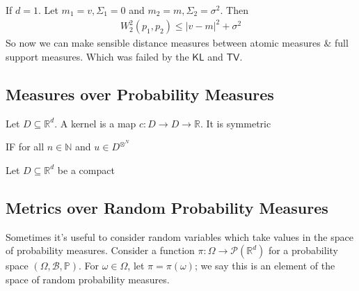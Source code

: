 \documentclass[11pt,fleqn]{article}
\numberwithin{equation}{section}
\theoremstyle{definition}
\theoremstyle{definition}
\begin{document}
\begin{remark}
	If $d=1$. Let $m_1= v, \Sigma_1 = 0$ and $m_2 = m, \Sigma_2 = \sigma^2$. Then
	\begin{align}
		W_2^2(p_1, p_2) \leq |v - m|^2 + \sigma^2
	\end{align}
	So now we can make sensible distance measures between atomic measures \& full support measures. Which was failed by the $\textsf{KL}$ and $\textsf{TV}$.
\end{remark}


\subsection{Measures over Probability Measures}
\begin{definition}
	[Kernel] Let $D \subseteq \mathbb R^d$. A kernel is a map $c : D \to  D \to \mathbb R$. It is symmetric
\end{definition}
\begin{definition}
	 IF for all $n \in \mathbb N$ and $u \in D^{\otimes^N}$ 
\end{definition}
\begin{theorem}
	[Mercer] Let $D \subseteq \mathbb R^d$ be a compact 
\end{theorem}

\subsection{Metrics over Random Probability Measures}
Sometimes it's useful to consider random variables which take values in the space of probability measures. Consider a function $\pi : \Omega \to \mathcal P(\mathbb R^d)$ for a probability space $(\Omega, \mathcal B, \mathbb P)$. For $\omega \in \Omega$, let $\pi = \pi(\omega)$; we say this is an element of the space of random probability measures.
\end{document}
